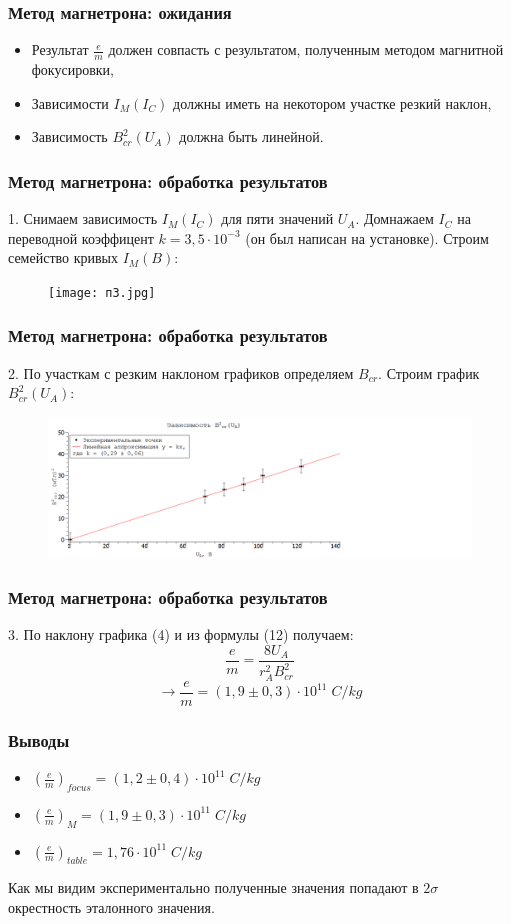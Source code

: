 \documentclass{beamer}
\begin{document}
\begin{frame}
\frametitle{Метод магнетрона: ожидания}
\begin{itemize}
    \item Результат $\frac{e}{m}$ должен совпасть с результатом, полученным методом магнитной фокусировки,
    \item Зависимости $I_M(I_C)$ должны иметь на некотором участке резкий наклон,
    \item Зависимость $B_{cr}^2(U_A)$ должна быть линейной.
\end{itemize}
    
\end{frame}

\begin{frame}
\frametitle{Метод магнетрона: обработка результатов}
1. Снимаем зависимость $I_M(I_C)$ для пяти значений $U_A$. Домнажаем $I_C$ на переводной коэффицент $k = 3,5 \cdot 10^{-3}$ (он был написан на установке). Строим семейство кривых $I_M(B):$
\begin{figure}
	\texttt{[image: п3.jpg]}
	\label{ris:ris2}
\end{figure}
\end{frame}

\begin{frame}
\frametitle{Метод магнетрона: обработка результатов}
2. По участкам с резким наклоном графиков определяем $B_{cr}$. Строим график $B_{cr}^2(U_A):$
\begin{figure}
	\includegraphics[width=17cm]{g4.PNG}
	\label{ris:ris2}
\end{figure}
\end{frame}
\begin{frame}
\frametitle{Метод магнетрона: обработка результатов}
3. По наклону графика (4) и из формулы (12) получаем:
\[\frac{e}{m} = \frac{8U_A}{r_A^2B_{cr}^2}\]
\[\longrightarrow \frac{e}{m} = (1,9 \pm 0,3) \cdot 10^{11}\; C/kg\]
\end{frame}

\begin{frame}
\frametitle{Выводы}
\begin{itemize}
    \item $(\frac{e}{m})_{focus} = (1,2 \pm 0,4)\cdot 10^{11}\;C/kg$
    \item $(\frac{e}{m})_M = (1,9 \pm 0,3)\cdot 10^{11}\;C/kg$
    \item $(\frac{e}{m})_{table} = 1,76\cdot 10^{11} \;C/kg$
\end{itemize}
Как мы видим экспериментально полученные значения попадают в $2\sigma$ окрестность эталонного значения.

\end{frame}
\end{document}
